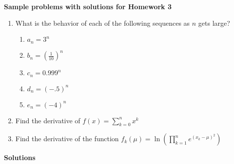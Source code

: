 \documentclass{article}
\begin{document}
\begin{center}
\textbf{
    Sample problems with solutions for Homework 3}
\end{center}
    \begin{enumerate}
        \item What is the behavior of each of the following sequences as $n$ gets large?
        \begin{enumerate}
            \item $a_n = 3^n$
            \item $b_n = \left(\frac{1}{10}\right)^n$
            \item $c_n = 0.999^n$
            \item $d_n = (-.5)^n$
            \item $e_n = (-4)^n$
        \end{enumerate}
        \item Find the derivative of $f(x)=\sum_{k=0}^nx^k$
        \item Find the derivative of the function $f_k(\mu) = \ln\left(\prod_{k=1}^{n}e^{(x_k-\mu)^2}\right)$
        
    \end{enumerate}
    
   \newpage 
    \begin{center}
        \textbf{\Large{Solutions}}
    \end{center}
    
\end{document}
